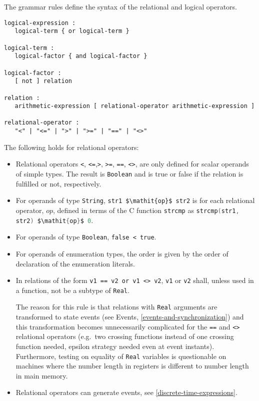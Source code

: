 The grammar rules define the syntax of the relational and logical operators.
\begin{lstlisting}[language=grammar]
logical-expression :
   logical-term { or logical-term }

logical-term :
   logical-factor { and logical-factor }

logical-factor :
   [ not ] relation

relation :
   arithmetic-expression [ relational-operator arithmetic-expression ]

relational-operator :
   "<" | "<=" | ">" | ">=" | "==" | "<>"
\end{lstlisting}

The following holds for relational operators:
\begin{itemize}
\item
  Relational operators \lstinline!<!, \lstinline!<=!,\lstinline!>!,
\lstinline!>=!, \lstinline!==!, \lstinline!<>!, are only defined for
  scalar operands of simple types. The result is \lstinline!Boolean! and is true or
  false if the relation is fulfilled or not, respectively.
\item
  For operands of type \lstinline!String!, \lstinline!str1 $\mathit{op}$ str2! is for each relational
  operator, $\mathit{op}$, defined in terms of the C function \lstinline[language=C]!strcmp! as
  \lstinline[language=C]!strcmp(str1, str2) $\mathit{op}$ 0!.
\item
  For operands of type \lstinline!Boolean!, \lstinline!false < true!.
\item
  For operands of enumeration types, the order is given by the order of
  declaration of the enumeration literals.
\item
  In relations of the form \lstinline!v1 == v2 or v1 <> v2!,
  \lstinline!v1! or \lstinline!v2! shall, unless used in a function, not be a subtype of \lstinline!Real!.
  \begin{nonnormative}
  The reason for this rule is that relations with \lstinline!Real! arguments are transformed to state events (see Events, \cref{events-and-synchronization}) and this transformation becomes unnecessarily complicated for the \lstinline!==! and \lstinline!<>! relational operators (e.g.\ two crossing functions instead of one crossing function needed, epsilon strategy needed even at event instants).  Furthermore, testing on equality of \lstinline!Real! variables is questionable on machines where the number length in registers is different to number length in main memory.
  \end{nonnormative}
\item
  Relational operators can generate events, see \cref{discrete-time-expressions}.
\end{itemize}

